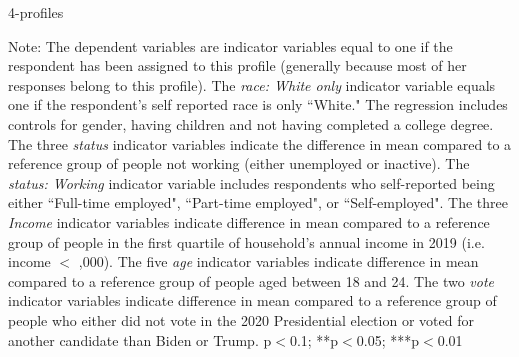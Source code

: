 \documentclass{article}
\begin{document}
\begin{table}[h!]
    \caption{4-profiles}
    \begin{center}
        \scalebox{0.7}{}
    \end{center}
    {\footnotesize Note: The dependent variables are indicator variables equal to one if the respondent has been assigned to this profile (generally because most of her responses belong to this profile). 
    The \textit{race: White only} indicator variable equals one if the respondent's self reported race is only ``White." The regression includes controls for gender, having children and not having completed a college degree. The three \textit{status} indicator variables indicate the difference in mean compared to a reference group of people not working (either unemployed or inactive). The \textit{status: Working} indicator variable includes respondents who self-reported being either ``Full-time employed", ``Part-time employed", or ``Self-employed". The three \textit{Income} indicator variables indicate difference in mean compared to a reference group of people in the first quartile of household's annual income in 2019 (i.e. income $<$ ,000). The five \textit{age} indicator variables indicate difference in mean compared to a reference group of people aged between 18 and 24. The two \textit{vote} indicator variables indicate difference in mean compared to a reference group of people who either did not vote in the 2020 Presidential election or voted for another candidate than Biden or Trump.
    \newline  *p$<$0.1; **p$<$0.05; ***p$<$0.01}
\end{table} 

\clearpage

\begin{spacing}{0.5}


\end{spacing}
\end{document}
